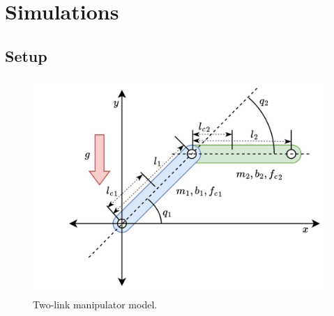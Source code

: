 \documentclass[letterpaper, 10 pt, conference]{ieeeconf}  %
\newtheorem{remark}{Remark}
\newcommand\R{\mathbb{R}}
\begin{document}


\section{Simulations}\label{sec:sim}

\subsection{Setup}

\begin{figure}[!t]
    \centering
    \includegraphics[width=0.8\linewidth]{fig/RobotModel.drawio.png}
    \caption{Two-link manipulator model.}
    \label{fig: manipulator}
\end{figure}
\end{document}
